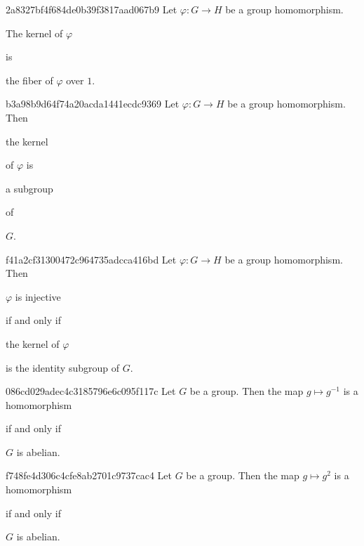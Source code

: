 \begin{note}{2a8327bf4f684de0b39f3817aad067b9}
    Let \({ \varphi : G \to H }\) be a group homomorphism.
    \begin{icloze}{2}The kernel of \({ \varphi }\)\end{icloze} is \begin{icloze}{1}the fiber of \({ \varphi }\) over \({ 1 }\).\end{icloze}
\end{note}

\begin{note}{b3a98b9d64f74a20acda1441ecdc9369}
    Let \({ \varphi : G \to H }\) be a group homomorphism.
    Then \begin{icloze}{3}the kernel\end{icloze} of \({ \varphi }\) is \begin{icloze}{1}a subgroup\end{icloze} of \begin{icloze}{2}\({ G }\).\end{icloze}
\end{note}

\begin{note}{f41a2cf31300472c964735adcca416bd}
    Let \({ \varphi : G \to H }\) be a group homomorphism.
    Then \begin{icloze}{3}\({ \varphi }\) is injective\end{icloze} \begin{icloze}{4}if and only if\end{icloze} \begin{icloze}{2}the kernel of \({ \varphi }\)\end{icloze} \begin{icloze}{1}is the identity subgroup of \({ G }\).\end{icloze}
\end{note}

\begin{note}{086cd029adec4c3185796e6c095f117c}
    Let \({ G }\) be a group. Then the map \({ g \mapsto g^{-1} }\) is a homomorphism \begin{icloze}{2}if and only if\end{icloze} \begin{icloze}{1}\({ G }\) is abelian.\end{icloze}
\end{note}

\begin{note}{f748fe4d306c4cfe8ab2701c9737cac4}
    Let \({ G }\) be a group. Then the map \({ g \mapsto g^2 }\) is a homomorphism \begin{icloze}{2}if and only if\end{icloze} \begin{icloze}{1}\({ G }\) is abelian.\end{icloze}
\end{note}

